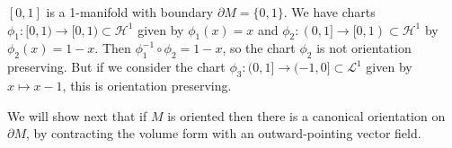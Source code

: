 \begin{xmpl}
$[0, 1]$ is a 1-manifold with boundary $\partial M = \{0, 1\}$. We
have charts $\phi_1: [0, 1) \to [0, 1) \subset \mathcal{H}^1$ given by
$\phi_1(x) = x$ and
$\phi_2: (0, 1] \to [0, 1) \subset \mathcal{H}^1$ by
$\phi_2(x) = 1 - x$. Then $\phi_1^{-1} \circ \phi_2 = 1 - x$, so the
chart $\phi_2$ is not orientation preserving. But if we consider the
chart $\phi_3 : (0, 1] \to (-1, 0] \subset \mathcal{L}^1$ given by $x
\mapsto x - 1$, this is orientation preserving.
\end{xmpl}

We will show next that if $M$ is oriented then there is a canonical
orientation on $\partial M$, by contracting the volume form with an
outward-pointing vector field.
